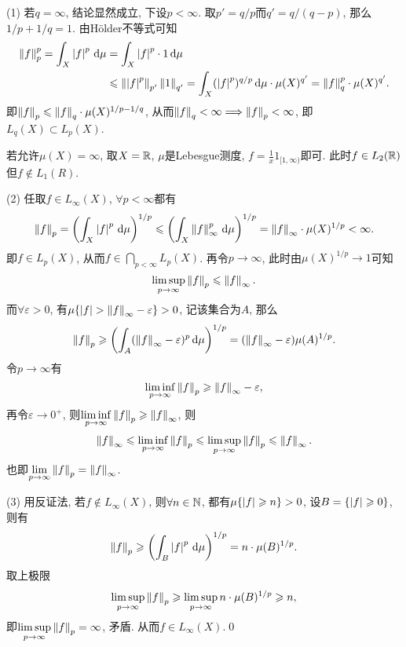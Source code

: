     \begin{Proof}
    (1) 若$ q=\infty $, 结论显然成立, 下设$ p<\infty $. 取$ p'=q/p $而$ q'=q/(q-p) $, 那么$ 1/p+1/q=1 $. 由H\"older不等式可知
    \[
    \begin{aligned}
    \left\| f \right\|_p^p=\int_X\left| f \right| ^p\,\mathrm{d}\mu&=\int_X\left| f \right| ^p\cdot 1\,\mathrm{d}\mu\\
    &\leqslant\left\| \left| f \right| ^p \right\|_{p'}\left\| 1 \right\|_{q'}=\int_X(\left| f \right| ^p)^{q/p}\,\mathrm{d}\mu\cdot\mu(X)^{q'}=\left\| f \right\|_q^p\cdot\mu(X)^{q'}.
    \end{aligned}
    \]
    即$ \left\| f \right\|_p\leqslant\left\| f \right\|_q\cdot\mu(X)^{1/p-1/q} $, 从而$ \left\| f \right\|_q<\infty\Longrightarrow\left\| f \right\|_p<\infty $, 即$ L_q(X)\subset L_p(X) $.
    
    若允许$ \mu(X)=\infty $, 取$ X=\mathbb{R} $, $ \mu $是Lebesgue测度, $ f=\frac{1}{x}1_{[1,\infty)} $即可. 此时$ f\in L_2(\mathbb{R}) $但$ f\notin L_1(R) $.
    
    (2) 任取$ f\in L_\infty(X) $, $ \forall p<\infty $都有
    \[
    \left\| f \right\|_p=\left(\int_X\left| f \right| ^p\,\mathrm{d}\mu\right)^{1/p}\leqslant\left(\int_X\left\| f \right\|_\infty^p\,\mathrm{d}\mu\right)^{1/p}=\left\| f \right\|_\infty\cdot\mu(X)^{1/p}<\infty.
    \]
    即$ f\in L_p(X) $, 从而$ f\in\bigcap_{p<\infty}L_p(X) $. 再令$ p\to\infty $, 此时由$ \mu(X)^{1/p}\to 1 $可知
    \[
    \limsup_{p\to\infty}\left\| f \right\|_p\leqslant\left\| f \right\|_\infty.
    \]
    而$ \forall\varepsilon>0 $, 有$ \mu\{ \left| f \right| >\left\| f \right\|_\infty-\varepsilon \}>0 $, 记该集合为$ A $, 那么
    \[
    \left\| f \right\|_p\geqslant\left(\int_A(\left\| f \right\|_\infty-\varepsilon)^p\,\mathrm{d}\mu\right)^{1/p}=(\left\| f \right\|_\infty-\varepsilon)\mu(A)^{1/p}.
    \]
    令$ p\to\infty $有
    \[
    \liminf_{p\to\infty}\left\| f \right\|_p\geqslant\left\| f \right\|_\infty-\varepsilon,
    \]
    再令$ \varepsilon\to 0^+ $, 则$ \liminf\limits_{p\to\infty}\left\| f \right\|_p\geqslant\left\| f \right\|_\infty $, 则
    \[
    \left\| f \right\|_\infty\leqslant\liminf_{p\to\infty}\left\| f \right\|_p\leqslant\limsup_{p\to\infty}\left\| f \right\|_p\leqslant\left\| f \right\|_\infty.
    \]
    也即$ \lim\limits_{p\to\infty}\left\| f \right\|_p=\left\| f \right\|_\infty $.
    
    (3) 用反证法, 若$ f\notin L_\infty(X) $, 则$ \forall n\in\mathbb{N} $, 都有$ \mu\{ \left| f \right| \geqslant n \}>0 $, 设$ B=\{ \left| f \right| \geqslant 0 \} $, 则有
    \[
    \left\| f \right\|_p\geqslant\left(\int_B\left| f \right| ^p\,\mathrm{d}\mu\right)^{1/p}=n\cdot\mu(B)^{1/p}.
    \]
    取上极限
    \[
    \limsup_{p\to\infty}\left\| f \right\|_p\geqslant\limsup_{p\to\infty}n\cdot\mu(B)^{1/p}\geqslant n,
    \]
    即$ \limsup\limits_{p\to\infty}\left\| f \right\|_p=\infty $, 矛盾. 从而$ f\in L_\infty(X) $.\qed
    \end{Proof}

